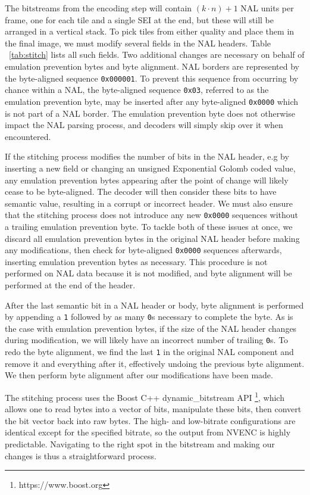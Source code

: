 The bitstreams from the encoding step will contain $(k \cdot n)+1$ NAL units per frame, one for each tile and a single SEI at the end, but these will still be arranged in a vertical stack. To pick tiles from either quality and place them in the final image, we must modify several fields in the NAL headers. Table ~\ref{tab:stitch} lists all such fields. Two additional changes are necessary on behalf of emulation prevention bytes and byte alignment. NAL borders are represented by the byte-aligned sequence \texttt{0x000001}. To prevent this sequence from occurring by chance within a NAL, the byte-aligned sequence \texttt{0x03}, referred to as the emulation prevention byte, may be inserted after any byte-aligned \texttt{0x0000} which is not part of a NAL border. The emulation prevention byte does not otherwise impact the NAL parsing process, and decoders will simply skip over it when encountered. 

If the stitching process modifies the number of bits in the NAL header, e.g by inserting a new field or changing an unsigned Exponential Golomb coded value, any emulation prevention bytes appearing after the point of change will likely cease to be byte-aligned. The decoder will then consider these bits to have semantic value, resulting in a corrupt or incorrect header. We must also ensure that the stitching process does not introduce any new \texttt{0x0000} sequences without a trailing emulation prevention byte. To tackle both of these issues at once, we discard all emulation prevention bytes in the original NAL header before making any modifications, then check for byte-aligned \texttt{0x0000} sequences afterwards, inserting emulation prevention bytes as necessary. This procedure is not performed on NAL data because it is not modified, and byte alignment will be performed at the end of the header.

After the last semantic bit in a NAL header or body, byte alignment is performed by appending a \texttt{1} followed by as many \texttt{0}s necessary to complete the byte. As is the case with emulation prevention bytes, if the size of the NAL header changes during modification, we will likely have an incorrect number of trailing \texttt{0}s. To redo the byte alignment, we find the last \texttt{1} in the original NAL component and remove it and everything after it, effectively undoing the previous byte alignment. We then perform byte alignment after our modifications have been made.

The stitching process uses the Boost C++ dynamic\_bitstream API \footnote{https://www.boost.org}, which allows one to read bytes into a vector of bits, manipulate these bits, then convert the bit vector back into raw bytes. The high- and low-bitrate configurations are identical except for the specified bitrate, so the output from NVENC is highly predictable. Navigating to the right spot in the bitstream and making our changes is thus a straightforward process.

